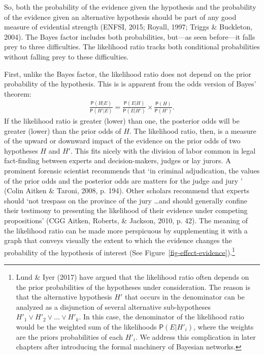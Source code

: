 \documentclass[
  letterpaper,
  DIV=11,
  numbers=noendperiod]{scrartcl}
\newcommand{\pr}[1]{\mathsf{P}(#1)}
\begin{document}
So, both the probability of the evidence given the hypothesis and the
probability of the evidence given an alternative hypothesis should be
part of any good measure of evidential strength (ENFSI, 2015; Royall,
1997; Triggs \& Buckleton, 2004). The Bayes factor includes both
probabilities, but---as seen before---it falls prey to three
difficulties. The likelihood ratio tracks both conditional probabilities
without falling prey to these difficulties.

First, unlike the Bayes factor, the likelihood ratio does not depend on
the prior probability of the hypothesis. This is is apparent from the
odds version of Bayes' theorem: \begin{align}\label{eq:BTodds}
\frac{\pr{H \vert E}}{\pr{H' \vert E}}= \frac{\pr{E \vert H}}{\pr{E \vert H'}}\times \frac{\pr{H}}{\pr{H'}}.
\end{align} \noindent If the likelihood ratio is greater (lower) than
one, the posterior odds will be greater (lower) than the prior odds of
\(H\). The likelihood ratio, then, is a measure of the upward or
downward impact of the evidence on the prior odds of two hypotheses
\(H\) and \(H'\). This fits nicely with the division of labor common in
legal fact-finding between experts and decision-makers, judges or lay
jurors. A prominent forensic scientist recommends that `in criminal
adjudication, the values of the prior odds and the posterior odds are
matters for the judge and jury ' (Colin Aitken \& Taroni, 2008, p. 194).
Other scholars recommend that experts should `not trespass on the
province of the jury \dots and should generally confine their testimony
to presenting the likelihood of their evidence under competing
propositions' (CGG Aitken, Roberts, \& Jackson, 2010, p. 42). The
meaning of the likelihood ratio can be made more perspicuous by
supplementing it with a graph that conveys visually the extent to which
the evidence changes the probability of the hypothesis of interest (See
Figure~\ref{fig-effect-evidence}).\footnote{Lund \& Iyer (2017) have
  argued that the likelihood ratio often depends on the prior
  probabilities of the hypotheses under consideration. The reason is
  that the alternative hypothesis \(H'\) that occurs in the denominator
  can be analyzed as a disjunction of several alternative sub-hypotheses
  \(H'_1\vee H'_2\vee ... \vee H'_k\). In this case, the denominator of
  the likelihood ratio would be the weighted sum of the likelihoods
  \(\pr{E \vert H'_i}\), where the weights are the priors probabilities
  of each \(H'_i\). We address this complication in later chapters after
  introducing the formal machinery of Bayesian networks.}
\end{document}
